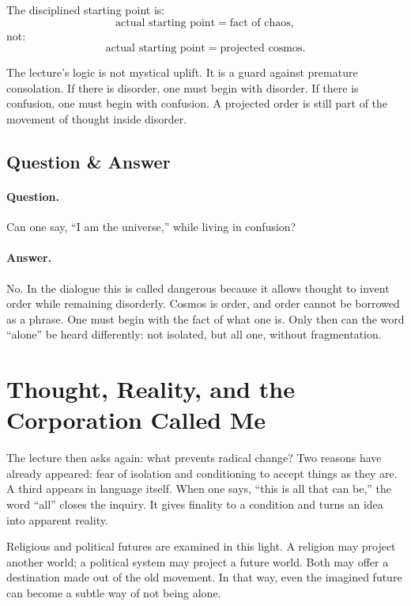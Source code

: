 The disciplined starting point is:
\begin{equation}
\text{actual starting point} = \text{fact of chaos},
\end{equation}
not:
\begin{equation}
\text{actual starting point} = \text{projected cosmos}.
\end{equation}

The lecture's logic is not mystical uplift. It is a guard against premature consolation. If there is disorder, one must begin with disorder. If there is confusion, one must begin with confusion. A projected order is still part of the movement of thought inside disorder.

\subsection{Question \& Answer}

\paragraph{Question.}
Can one say, ``I am the universe,'' while living in confusion?

\paragraph{Answer.}
No. In the dialogue this is called dangerous because it allows thought to invent order while remaining disorderly. Cosmos is order, and order cannot be borrowed as a phrase. One must begin with the fact of what one is. Only then can the word ``alone'' be heard differently: not isolated, but all one, without fragmentation.

\section{Thought, Reality, and the Corporation Called Me}

The lecture then asks again: what prevents radical change? Two reasons have already appeared: fear of isolation and conditioning to accept things as they are. A third appears in language itself. When one says, ``this is all that can be,'' the word ``all'' closes the inquiry. It gives finality to a condition and turns an idea into apparent reality.

Religious and political futures are examined in this light. A religion may project another world; a political system may project a future world. Both may offer a destination made out of the old movement. In that way, even the imagined future can become a subtle way of not being alone.

